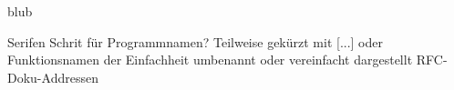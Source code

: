blub

Serifen Schrit für Programmnamen?
Teilweise gekürzt mit [...] oder Funktionsnamen der Einfachheit umbenannt oder vereinfacht dargestellt
RFC-Doku-Addressen
